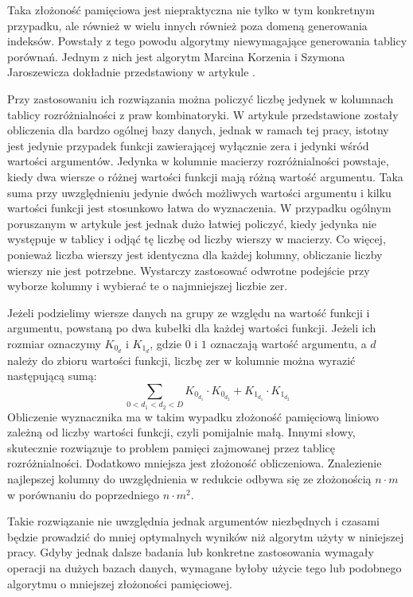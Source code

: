 Taka złożoność pamięciowa jest niepraktyczna nie tylko w tym konkretnym przypadku,
ale również w wielu innych również poza domeną generowania indeksów.
Powstały z tego powodu algorytmy niewymagające generowania tablicy porównań.
Jednym z nich jest algorytm Marcina Korzenia i Szymona Jaroszewicza dokładnie przedstawiony w artykule \cite{without-matrix}.

Przy zastosowaniu ich rozwiązania można policzyć liczbę jedynek w kolumnach tablicy rozróżnialności z praw kombinatoryki.
W artykule przedstawione zostały obliczenia dla bardzo ogólnej bazy danych,
jednak w ramach tej pracy,
istotny jest jedynie przypadek funkcji zawierającej wyłącznie zera i jedynki wśród wartości argumentów.
Jedynka w kolumnie macierzy rozróżnialności powstaje,
kiedy dwa wiersze o różnej wartości funkcji mają różną wartość argumentu.
Taka suma przy uwzględnieniu jedynie dwóch możliwych wartości argumentu i kilku wartości funkcji jest stosunkowo łatwa do wyznaczenia.
W przypadku ogólnym poruszanym w artykule jest jednak dużo łatwiej policzyć,
kiedy jedynka nie występuje w tablicy i odjąć tę liczbę od liczby wierszy w macierzy.
Co więcej,
ponieważ liczba wierszy jest identyczna dla każdej kolumny,
obliczanie liczby wierszy nie jest potrzebne.
Wystarczy zastosować odwrotne podejście przy wyborze kolumny i wybierać te o najmniejszej liczbie zer.

Jeżeli podzielimy wiersze danych na grupy ze względu na wartość funkcji i argumentu,
powstaną po dwa kubełki dla każdej wartości funkcji.
Jeżeli ich rozmiar oznaczymy $K_{0_d}$ i $K_{1_d}$,
 gdzie $0$ i $1$ oznaczają wartość argumentu,
a $d$ należy do zbioru wartości funkcji,
liczbę zer w kolumnie można wyrazić następującą sumą:
\begin{equation}
\sum_{0<d_1<d_2<D} K_{0_{d_1}} \cdot K_{0_{d_2}} + K_{1_{d_1}} \cdot K_{1_{d_2}}
\end{equation}
Obliczenie wyznacznika ma w takim wypadku złożoność pamięciową liniowo zależną od liczby wartości funkcji,
czyli pomijalnie małą.
Innymi słowy, skutecznie rozwiązuje to problem pamięci zajmowanej przez tablicę rozróżnialności.
Dodatkowo mniejsza jest złożoność obliczeniowa.
Znalezienie najlepszej kolumny do uwzględnienia w redukcie odbywa się ze złożonością $n \cdot m$ w porównaniu do poprzedniego $n \cdot m^2$.

Takie rozwiązanie nie uwzględnia jednak argumentów niezbędnych i czasami będzie prowadzić do mniej optymalnych wyników niż algorytm użyty w niniejszej pracy.
Gdyby jednak dalsze badania lub konkretne zastosowania wymagały operacji na dużych bazach danych,
wymagane byłoby użycie tego lub podobnego algorytmu o mniejszej złożoności pamięciowej.

